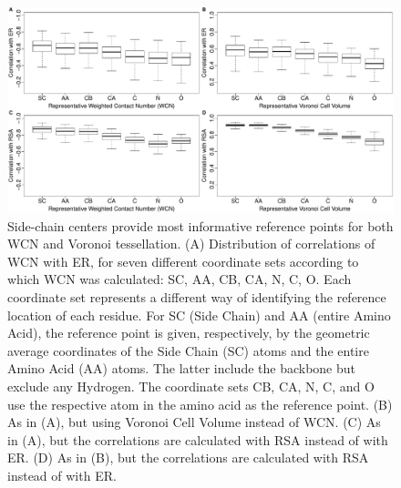 \documentclass[12pt]{article}
\begin{document}
    \begin{figure}
        \begin{center}
        \includegraphics[width=6.5in]{best_wcn_vvol_boxplot.pdf}
        \end{center}
        \caption{Side-chain centers provide most informative reference points for both WCN and Voronoi tessellation. (A) Distribution of correlations of WCN with ER, for seven different coordinate sets according to which WCN was calculated: SC, AA, CB, CA, N, C, O. Each coordinate set represents a different way of identifying the reference location of each residue. For SC (Side Chain) and AA (entire Amino Acid), the reference point is given, respectively, by the geometric average coordinates of the Side Chain (SC) atoms and the entire Amino Acid (AA) atoms. The latter include the backbone but exclude any Hydrogen. The coordinate sets CB, CA, N, C, and O use the respective atom in the amino acid as the reference point. (B) As in (A), but using Voronoi Cell Volume instead of WCN. (C) As in (A), but the correlations are calculated with RSA instead of with ER. (D) As in (B), but the correlations are calculated with RSA instead of with ER.}
        \label{fig:best_wcn_vvol}
    \end{figure}
\end{document}
